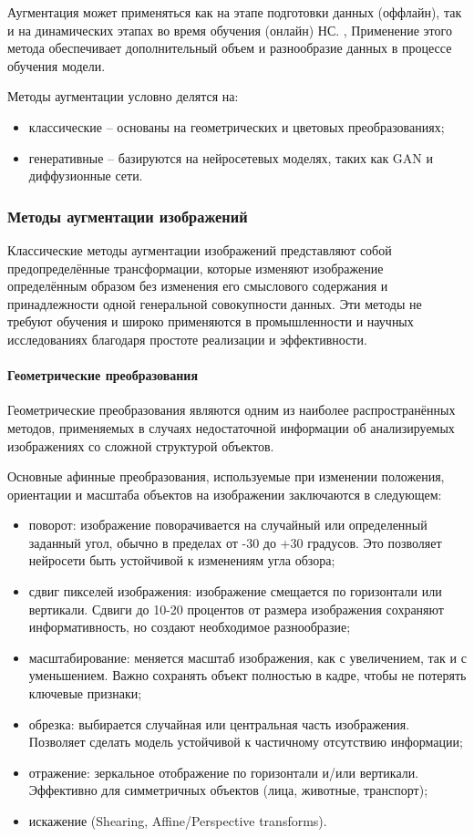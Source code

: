 Аугментация может применяться как на этапе подготовки данных (оффлайн), так и на динамических этапах во время обучения (онлайн) НС. , Применение этого метода обеспечивает дополнительный объем и разнообразие данных в процессе обучения модели.

Методы аугментации условно делятся на:

\begin{itemize}
	\item классические – основаны на геометрических и цветовых преобразованиях;
	\item генеративные – базируются на нейросетевых моделях, таких как GAN и диффузионные сети.
\end{itemize}

\subsubsection{Методы аугментации изображений}

Классические методы аугментации изображений представляют собой предопределённые трансформации, которые изменяют изображение определённым образом без изменения его смыслового содержания и принадлежности одной генеральной совокупности данных. Эти методы не требуют обучения и широко применяются в промышленности и научных исследованиях благодаря простоте реализации и эффективности.

\paragraph{Геометрические преобразования}

Геометрические преобразования являются одним из наиболее распространённых методов, применяемых в случаях недостаточной информации об анализируемых изображениях со сложной структурой объектов.

Основные афинные преобразования, используемые при изменении положения, ориентации и масштаба объектов на изображении заключаются в следующем:

\begin{itemize}
	\item поворот: изображение поворачивается на случайный или определенный заданный угол, обычно в пределах от -30 до +30 градусов. Это позволяет нейросети быть устойчивой к изменениям угла обзора;
	\item сдвиг пикселей изображения: изображение смещается по горизонтали или вертикали. Сдвиги до 10-20 процентов от размера изображения сохраняют информативность, но создают необходимое разнообразие;
	\item масштабирование: меняется масштаб изображения, как с увеличением, так и с уменьшением. Важно сохранять объект полностью в кадре, чтобы не потерять ключевые признаки;
	\item обрезка: выбирается случайная или центральная часть изображения. Позволяет сделать модель устойчивой к частичному отсутствию информации;
	\item отражение: зеркальное отображение по горизонтали и/или вертикали. Эффективно для симметричных объектов (лица, животные, транспорт);
	\item искажение (Shearing, Affine/Perspective transforms).
\end{itemize}

